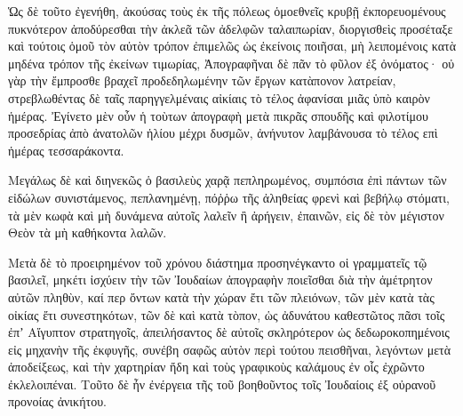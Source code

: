 {\par }{\PP {}Ὡς δὲ τοῦτο ἐγενήθη, ἀκούσας τοὺς ἐκ τῆς πόλεως ὁμοεθνεῖς κρυβῇ ἐκπορευομένους πυκνότερον ἀποδύρεσθαι τὴν ἀκλεᾶ τῶν ἀδελφῶν ταλαιπωρίαν,
διοργισθεὶς προσέταξε καὶ τούτοις ὁμοῦ τὸν αὐτὸν τρόπον ἐπιμελῶς ὡς ἐκείνοις ποιῆσαι, μὴ λειπομένοις κατὰ μηδένα τρόπον τῆς ἐκείνων τιμωρίας, Ἀπογραφῆναι δὲ πᾶν τὸ φῦλον ἐξ ὀνόματος·
οὐ γὰρ τὴν ἔμπροσθε βραχεῖ προδεδηλωμένην τῶν ἔργων κατὰπονον λατρείαν, στρεβλωθέντας δὲ ταῖς παρηγγελμέναις αἰκίαις τὸ τέλος ἀφανίσαι μιᾶς ὑπὸ καιρὸν ἡμέρας.
Ἐγίνετο μὲν οὖν ἡ τοὺτων ἀπογραφὴ μετὰ πικρᾶς σπουδῆς καὶ φιλοτίμου προσεδρίας ἀπὸ ἀνατολῶν ἡλίου μέχρι δυσμῶν, ἀνήνυτον λαμβάνουσα τὸ τέλος επὶ ἡμέρας τεσσαράκοντα.
\par }{\PP {}Μεγάλως δὲ καὶ διηνεκῶς ὁ βασιλεὺς χαρᾷ πεπληρωμένος, συμπόσια ἐπὶ πάντων τῶν εἰδώλων συνιστάμενος, πεπλανημένῃ, πόῤῥω τῆς ἀληθείας φρενὶ καὶ βεβήλῳ στόματι, τὰ μὲν κωφὰ καὶ μὴ δυνάμενα αὐτοῖς λαλεῖν ἢ ἀρήγειν, ἐπαινῶν, εἰς δὲ τὸν μέγιστον Θεὸν τὰ μὴ καθήκοντα λαλῶν.
\par }{\PP {}Μετὰ δὲ τὸ προειρημένον τοῦ χρόνου διάστημα προσηνέγκαντο οἱ γραμματεῖς τῷ βασιλεῖ, μηκέτι ἰσχύειν τὴν τῶν Ἰουδαίων ἀπογραφὴν ποιεῖσθαι διὰ τὴν ἀμέτρητον αὐτῶν πληθὺν, καί περ ὄντων κατὰ τὴν χώραν ἔτι τῶν πλειόνων,
τῶν μὲν κατὰ τὰς οἰκίας ἔτι συνεστηκότων, τῶν δὲ καὶ κατὰ τὸπον, ὡς ἀδυνάτου καθεστῶτος πᾶσι τοῖς ἐπʼ Αἴγυπτον στρατηγοῖς,
ἀπειλήσαντος δὲ αὐτοῖς σκληρότερον ὡς δεδωροκοπημένοις εἰς μηχανὴν τῆς ἐκφυγῆς, συνέβη σαφῶς αὐτὸν περὶ τούτου πεισθῆναι,
λεγόντων μετὰ ἀποδείξεως, καὶ τὴν χαρτηρίαν ἤδη καὶ τοὺς γραφικοὺς καλάμους ἐν οἷς ἐχρῶντο ἐκλελοιπέναι.
Τοῦτο δὲ ἦν ἐνέργεια τῆς τοῦ βοηθοῦντος τοῖς Ἰουδαίοις ἐξ οὐρανοῦ προνοίας ἀνικήτου.

}
